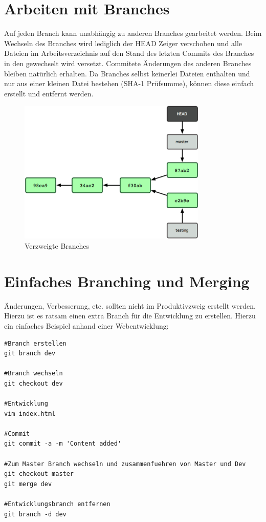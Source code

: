 \section{Arbeiten mit Branches}
Auf jeden Branch kann unabhängig zu anderen Branches gearbeitet werden. Beim Wechseln des Branches wird lediglich der HEAD Zeiger verschoben und alle Dateien im Arbeitsverzeichnis auf den Stand des letzten Commits des Branches in den gewechselt wird versetzt. Commitete Änderungen des anderen Branches bleiben natürlich erhalten. Da Branches selbst keinerlei Dateien enthalten und nur aus einer kleinen Datei bestehen (SHA-1 Prüfsumme), können diese einfach erstellt und entfernt werden.
\begin{figure}[ht]
	\centering
		\includegraphics[width=0.8\textwidth]{img/branches.png}
	\caption{Verzweigte Branches}
\end{figure}
\newpage
\section{Einfaches Branching und Merging}
Änderungen, Verbesserung, etc. sollten nicht im Produktivzweig erstellt werden. Hierzu ist es ratsam einen extra Branch für die Entwicklung zu erstellen. Hierzu ein einfaches Beispiel anhand einer Webentwicklung:
\begin{lstlisting}[caption={Einfaches Merging Beispiel},captionpos=b]
#Branch erstellen
git branch dev

#Branch wechseln
git checkout dev

#Entwicklung
vim index.html

#Commit
git commit -a -m 'Content added'

#Zum Master Branch wechseln und zusammenfuehren von Master und Dev
git checkout master
git merge dev

#Entwicklungsbranch entfernen
git branch -d dev
\end{lstlisting}
